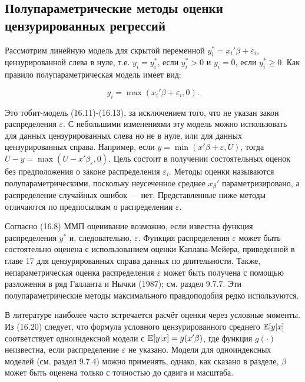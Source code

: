 \subsection{Полупараметрические методы оценки цензурированных регрессий}


Рассмотрим линейную модель для скрытой переменной $y_i^{*}=x_i'\beta+\varepsilon_i$, цензурированной слева  в нуле, т.е. $y_i=y_i^{*}$, если $y_i^{*}>0$ и $y_i=0$, если $y_i^{*}{\geq}0$. Как правило полупараметрическая модель имеет вид:

\begin{equation}
y_i=\max(x_i'\beta+\varepsilon_i,0).
\end{equation}

Это тобит-модель (16.11)-(16.13), за исключением того, что не указан закон распределения $\varepsilon$. С небольшими изменениями эту модель можно использовать для данных цензурированных слева но не в нуле, или для данных цензурированных справа. Например, если $y=\min(x'\beta+\varepsilon,U)$, тогда $U-y=\max(U-x'\beta_\varepsilon,0)$. Цель состоит в получении состоятельных оценок без предположения о законе распределения $\varepsilon_i$. Методы оценки называются полупараметрическими, поскольку неусеченное среднее $x_\beta'$ параметризировано, а распределение случайных ошибок --- нет. Представленные ниже методы отличаются по предпосылкам о распределении $\varepsilon$. 

Согласно (16.8) ММП оценивание возможно, если известна функция  распределения $y^* $ и, следовательно, $\varepsilon$. Функция распределения $\varepsilon$ может быть состоятельно оценена с использованием оценки Каплана-Мейера, приведенной в главе 17  для цензурированных справа данных по длительности. Также, непараметрическая оценка распределения $\varepsilon$ может быть получена с помощью  разложения в ряд Галланта и Нычки (1987); см. раздел 9.7.7. Эти полупараметрические методы максимального правдоподобия редко используются.

В литературе наиболее часто встречается расчёт оценки через условные моменты. Из (16.20) следует, что формула условного цензурированного среднего $\mathbb{E}[y|x]$ соответствует одноиндексной модели с $\mathbb{E}[y|x]=g(x'\beta)$, где функция $g(\cdot )$ неизвестна, если распределение $\varepsilon$ не указано. Модели для одноиндексных моделей  (см. раздел 9.7.4) можно применять, однако, как сказано в разделе, $\beta$ может быть оценена только с точностью до сдвига и масштаба. 

